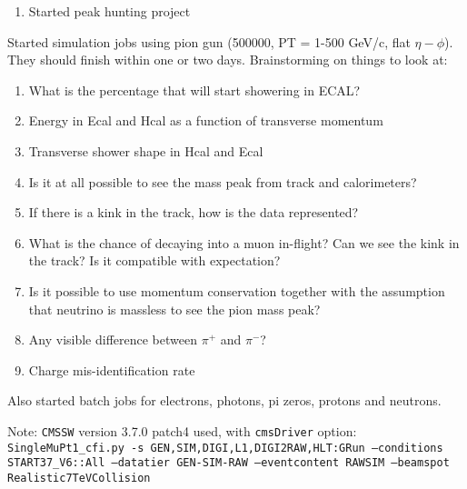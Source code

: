 

\begin{enumerate}
\item Started peak hunting project
\end{enumerate}


Started simulation jobs using pion gun (500000, PT = 1-500 GeV/c, flat $\eta-\phi$).
They should finish within one or two days.
Brainstorming on things to look at:

\begin{enumerate}
\item What is the percentage that will start showering in ECAL?
\item Energy in Ecal and Hcal as a function of transverse momentum
\item Transverse shower shape in Hcal and Ecal
\item Is it at all possible to see the mass peak from track and calorimeters?
\item If there is a kink in the track, how is the data represented?
\item What is the chance of decaying into a muon in-flight?  Can we see the kink in the track?  Is it compatible with expectation?
\item Is it possible to use momentum conservation together with the assumption that neutrino is massless to see the pion mass peak?
\item Any visible difference between $\pi^+$ and $\pi^-$?
\item Charge mis-identification rate
\end{enumerate}

Also started batch jobs for electrons, photons, pi zeros, protons and neutrons.

Note: \texttt{CMSSW} version 3.7.0 patch4 used, with \texttt{cmsDriver} option:
\texttt{SingleMuPt1\_cfi.py -s GEN,SIM,DIGI,L1,DIGI2RAW,HLT:GRun --conditions START37\_V6::All --datatier GEN-SIM-RAW --eventcontent RAWSIM --beamspot Realistic7TeVCollision}




